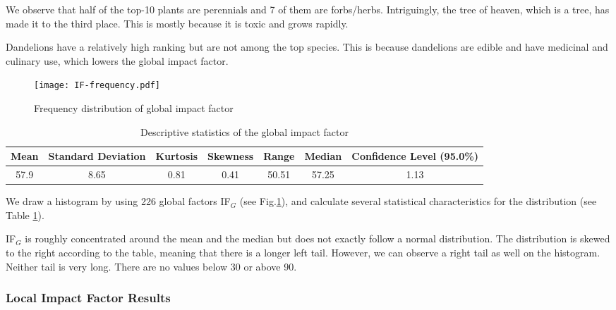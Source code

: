 \documentclass[12pt]{article}
\begin{document}
		We observe that half of the top-10 plants are perennials and 7 of them are forbs/herbs.  Intriguingly, the tree of heaven, which is a tree, has made it to the third place.  This is mostly because it is toxic and grows rapidly. 
		
		Dandelions have a relatively high ranking but are not among the top species.  This is because dandelions are edible and have medicinal and culinary use, which lowers the global impact factor.
	
		\begin{figure}[htbp]
		\centering
		\texttt{[image: IF-frequency.pdf]}
		\caption{Frequency distribution of global impact factor}
		\label{fig:freqIF}
		\end{figure}
	
		{
			\fontsize{10}{14}\selectfont
			{
				\begin{longtable}{ccccccc}
					\caption{Descriptive statistics of the global impact factor}
					\label{tb:IFDistribution}\\
					
					\toprule
					Mean&Standard Deviation&Kurtosis&Skewness&Range&Median&Confidence Level (95.0\%)\\
					\toprule
					57.9&8.65&0.81&0.41&50.51&57.25&1.13\\
					\bottomrule
				\end{longtable}
			}
		}
		
		We draw a histogram by using 226 global factors IF$_G$ (see Fig.\ref{fig:freqIF}), and calculate several statistical characteristics for the distribution (see Table \ref{tb:IFDistribution}).  
		
		IF$_G$ is roughly concentrated around the mean and the median but does not exactly follow a normal distribution.  The distribution is skewed to the right according to the table, meaning that there is a longer left tail.  However, we can observe a right tail as well on the histogram.  Neither tail is very long.  There are no values below 30 or above 90.
		
	\subsubsection{Local Impact Factor Results}
		
\end{document}
